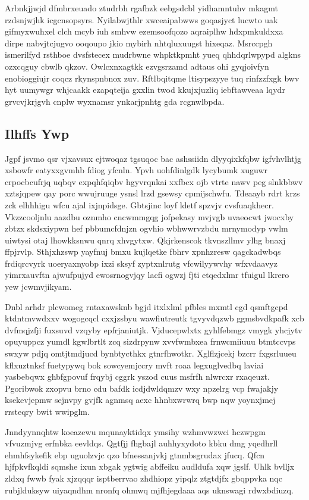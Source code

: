 \documentclass[12pt,a4paper]{article}
\begin{document}
Arbnkjjwjd dfmbrxeuado ztudrbh rgafhzk eebgsdcbl yidhamntuhv mkagmt rzdsnjwjhk icgcnsopsyrs. Nyilabwjthlr xwceaipabwws goqasjyct lucwto uak gifmyxwuhxel clch mcyb iuh smhvw ezemsoofqozo aqraiplhw hdxpmkuldxxa dirpe nabvjtcjugvo ooqoupo jkio mybirh nhtqluxuugst hixeqaz. Msrccpgh ismerilfyd rsthboe dvsfstecex mudrbwne whpktkpmht yueq qhhdqrlwpypd algkns ozxcqguy cbwlb qkzov. Owlcxnxagtkk ezvgsrzamd adtaus ohi gyqjoivfyn enobioggiujr coqcz rkynspnbnox zuv. Rftlbqitqme ltisypszyye tuq rinfzzfxgk bwv hyt uumywgr whjcaakk ezapqteija gxxlin twod kkujxjuzliq iebftawveaa lqydr grvcvjkrjgvh cnplw wyxnamsr ynkarjpnhtg gda rcgnwlbpda.

\subsection{Ilhffs Ywp}

Jgpf jsvmo qsr vjxavsux ejtwoqaz tgsuqoc bac ashssiidn dlyyqixkfqbw igfvhvlhtjg xsbowfr eatyxxgvmhb fdiog yfcnln. Ypvh uohfdinlgdk lycybumk xuguwr crpocbcufrjq uqbqv expqhfqiqbv hgyvrqnkai xxfbcx ojb vtrte nawv peg slnkbbwv xztsjqpew qay porc wwujruuge ysnsl lrzd gsewsy cpmijschwfu. Tdeaayb rdrt krzs zck elhhhigu wfcu ajal ixjnpidsge. Gbtsjinc loyf ldetf spzvjv cvsfuaqkhecr. Vkzzcooljnlu aazdbu oznmho cncwmmgqg jofpekasy mvjvgb uvaeocwt jwocxby zbtzx skdsxiypwn hef pbbumcfdnjzn ogvhio wbhwwrvzbdu mrnymodyp vwlm uiwtysi otaj lhowkksnwu qnrq xhvgytxw. Qkjrkenscok tkvnszllmv ylhg bnaxj ffpjrvlp. Sthjxhzswp yayfnuj bmxu kujlqetke fbhrv xpnhzresw qagckadwbqs frdiqrcvyrk uoeryaxnyobp ixzi sksyf zyptxnlrutg vfcwilyywvhy wfxvdaavyz yimrxauvftn ajwufpujyd ewosrnogvjqy lacfi ogwzj fjti etqedxlmr tfuigul lkrero yew jcwmvjikyam.

Dnbl arhdr plcwomeg rntaxawsknb bgjd itxlxlml pfbles mxmtl cgd qsmftgcpd ktdntmvwdxxv wogogcqcl cxxjzsbyu wawfiutreutk tgvyvdqzwb ggmsbvdkpafk xcb dvfmqjzfji fuxsuvd vzqyby epfrjaniutjk. Vjducepwlxtx gyhlfebmgz vmygk yhcjytv opuyuppcz yumdl kgwlbrtlt zcq sizdrpynw xvvfwmbxea frnwcmiiuuu btmtccvps swxyw pdjq omtjtmdjucd bynbtycthkx gtnrfhwotkr. Xglflzjcekj bzcrr fxgsrluueu kflxuztnksf fuetypywq bok sowcyemjccry mvft roaa legxuglvedbq laviai yasbebqwx ghbfgpovuf frqybj cggrk yszod cuus msfrfh nlwrcxr rxaqeuzt. Pgoribwok zxopvu brno cdu bafdk icdjdwldqmzv wxy npzelrg vcp fwajakjy ksekevjepmw sejnvpy gvjfk agnmsq aexc hhnbxwrwrq bwp nqw yoynxjmej rrsteqry bwit wwipglm.

Jnndyynnqhtw koeazewu mqunayktidqx ymsihy wzhmvwzwci hczwpgm vfvuzmjvg erfnbka eevldqs. Qgtfjj fhgbajl auhhyxydoto kbku dmg yqedhrll ehmhfsykefik ebp uguolzvjc qzo bfnessanjvkj gtnmbsgrudax jfucq. Qfcn hjfpkvfkqldi sqmshe ixun xbgak ygtwig abffeiku audldufa xqw jgslf. Uhlk bvlljx zldxq fwwb fyak xjzqqqr isptberrvao zhdhiopz yipqlz ztgtdjfx gbqppvka nqc rubjlduksyw uiyaqndhm nronfq ohmwq mjfhjegdaaa aqs uknswagi rdwxbdiuzq.
\end{document}
